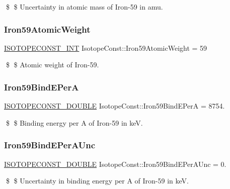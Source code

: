 \$ \$ Uncertainty in atomic mass of Iron-\/59 in amu. \mbox{\label{group___isotope_const-_iron-_fe59_ga647ca456271c890f7bd61881737064e1}} 
\subsubsection{\texorpdfstring{Iron59\+Atomic\+Weight}{Iron59AtomicWeight}}
{\footnotesize\ttfamily \mbox{\hyperlink{group___isotope_const-_macros_ga5f18360b3e99483a35c32d789e62621c}{I\+S\+O\+T\+O\+P\+E\+C\+O\+N\+S\+T\+\_\+\+I\+NT}} Isotope\+Const\+::\+Iron59\+Atomic\+Weight = 59}

\$ \$ Atomic weight of Iron-\/59. \mbox{\label{group___isotope_const-_iron-_fe59_ga67904c155ae65bc3f72083d78de4b9e1}} 
\subsubsection{\texorpdfstring{Iron59\+Bind\+E\+PerA}{Iron59BindEPerA}}
{\footnotesize\ttfamily \mbox{\hyperlink{group___isotope_const-_macros_ga8f45a7272ce02c0b4c65c44636ed719a}{I\+S\+O\+T\+O\+P\+E\+C\+O\+N\+S\+T\+\_\+\+D\+O\+U\+B\+LE}} Isotope\+Const\+::\+Iron59\+Bind\+E\+PerA = 8754.}

\$ \$ Binding energy per A of Iron-\/59 in keV. \mbox{\label{group___isotope_const-_iron-_fe59_ga6787cf7ed80a97e5fc1f93d08903fe89}} 
\subsubsection{\texorpdfstring{Iron59\+Bind\+E\+Per\+A\+Unc}{Iron59BindEPerAUnc}}
{\footnotesize\ttfamily \mbox{\hyperlink{group___isotope_const-_macros_ga8f45a7272ce02c0b4c65c44636ed719a}{I\+S\+O\+T\+O\+P\+E\+C\+O\+N\+S\+T\+\_\+\+D\+O\+U\+B\+LE}} Isotope\+Const\+::\+Iron59\+Bind\+E\+Per\+A\+Unc = 0.}

\$ \$ Uncertainty in binding energy per A of Iron-\/59 in keV. \mbox{\label{group___isotope_const-_iron-_fe59_ga4de7bdfec14040285c904d5813569e34}} 

